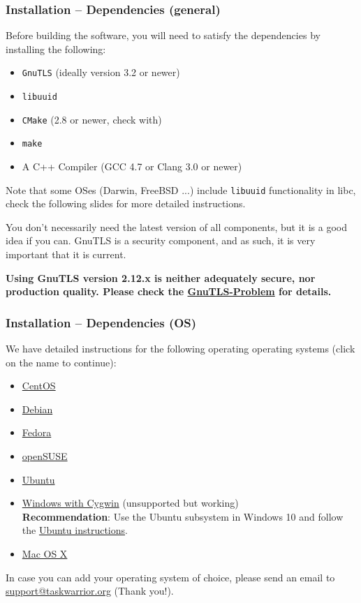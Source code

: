 \documentclass[t,handout]{beamer}
\begin{document}
\begin{frame}[fragile]\frametitle{Installation -- Dependencies (general)}\label{dependencies}
    \vfill
    Before building the software, you will need to satisfy the dependencies by installing the following:

    \begin{itemize}
        \item \verb+GnuTLS+ (ideally version 3.2 or newer)
        \item \verb+libuuid+
        \item \verb+CMake+ (2.8 or newer, check with)
        \item \verb+make+
        \item A C++ Compiler (GCC 4.7 or Clang 3.0 or newer)
    \end{itemize}

    Note that some OSes (Darwin, FreeBSD ...) include \verb+libuuid+ functionality in libc, check the following slides for more detailed instructions.

    You don't necessarily need the latest version of all components, but it is a good idea if you can.  GnuTLS is a security component, and as such, it is very important that it is current.

    \textbf{Using GnuTLS version 2.12.x is neither adequately secure, nor production quality. Please check the \hyperlink{gnutlsproblem}{GnuTLS-Problem} for details.}
\end{frame}

\begin{frame}[fragile]\frametitle{Installation -- Dependencies (OS)}
    \vfill
    We have detailed instructions for the following operating operating systems (click on the name to continue):

    \begin{itemize}
        \item \hyperlink{centos}{CentOS}
        \item \hyperlink{debian}{Debian}
        \item \hyperlink{fedora}{Fedora}
        \item \hyperlink{opensuse}{openSUSE}
        \item \hyperlink{ubuntu}{Ubuntu}
        \item \hyperlink{windows}{Windows with Cygwin} (unsupported but working) \\
                \textbf{Recommendation}: Use the Ubuntu subsystem in Windows 10 and follow the \hyperlink{ubuntu}{Ubuntu instructions}.
        \item \hyperlink{macosx}{Mac OS X}
    \end{itemize}

    In case you can add your operating system of choice, please send an email to \href{mailto:support@taskwarrior.org}{support@taskwarrior.org} (Thank you!).
\end{frame}
\end{document}
